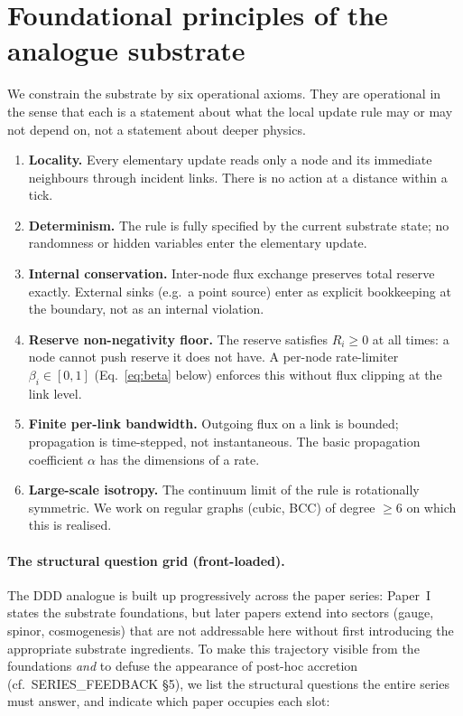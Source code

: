 \documentclass[11pt,a4paper]{article}
\begin{document}
\section{Foundational principles of the analogue substrate}
\label{sec:principles}

We constrain the substrate by six operational axioms. They are
operational in the sense that each is a statement about what
the local update rule may or may not depend on, not a statement
about deeper physics.

\begin{enumerate}
\item[(L1)] \textbf{Locality.} Every elementary update reads
only a node and its immediate neighbours through incident
links. There is no action at a distance within a tick.
\item[(L2)] \textbf{Determinism.} The rule is fully specified by
the current substrate state; no randomness or hidden variables
enter the elementary update.
\item[(L3)] \textbf{Internal conservation.} Inter-node flux
exchange preserves total reserve exactly. External sinks (e.g.\
a point source) enter as explicit bookkeeping at the boundary,
not as an internal violation.
\item[(L4)] \textbf{Reserve non-negativity floor.} The reserve
satisfies $R_i \ge 0$ at all times: a node cannot push reserve
it does not have. A per-node rate-limiter
$\beta_i \in [0,1]$ (Eq.~\eqref{eq:beta} below) enforces this
without flux clipping at the link level.
\item[(L5)] \textbf{Finite per-link bandwidth.} Outgoing flux
on a link is bounded; propagation is time-stepped, not
instantaneous. The basic propagation coefficient $\alpha$ has
the dimensions of a rate.
\item[(L6)] \textbf{Large-scale isotropy.} The continuum limit
of the rule is rotationally symmetric. We work on regular
graphs (cubic, BCC) of degree $\ge 6$ on which this is realised.
\end{enumerate}

\paragraph{The structural question grid (front-loaded).}
The DDD analogue is built up progressively across the paper
series: Paper~I states the substrate foundations, but later
papers extend into sectors (gauge, spinor, cosmogenesis) that
are not addressable here without first introducing the
appropriate substrate ingredients. To make this trajectory
visible from the foundations \emph{and} to defuse the
appearance of post-hoc accretion (cf.\ SERIES\_FEEDBACK §5),
we list the structural questions the entire series must
answer, and indicate which paper occupies each slot:
\end{document}
